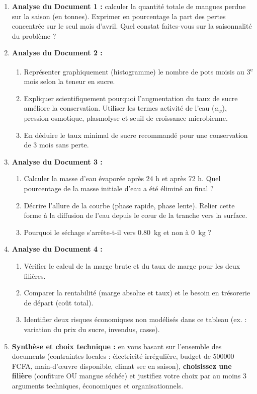 \documentclass[11pt]{article}
\newcommand{\cle}[1]{{\popxbold\color{popdark}#1}}
\newcounter{popsec}
\newcounter{popsub}
\newcommand{\courssub}[1]{%
  \stepcounter{popsub}%
  \par\vspace{9pt}\noindent{\popxbold\fontsize{11.5}{13}\selectfont\color{popink}{\color{poporange}\thepopsec.\thepopsub}\hspace{6pt}#1}\par\nopagebreak\vspace{4pt}
}
\begin{document}
\courssub{Consignes}
\begin{enumerate}
    \item \textbf{Analyse du Document 1 :} calculer la quantité totale de mangues perdue sur la saison (en tonnes). Exprimer en pourcentage la part des pertes concentrée sur le seul mois d'avril. Quel constat faites-vous sur la saisonnalité du problème ?
    \item \textbf{Analyse du Document 2 :}
    \begin{enumerate}
        \item Représenter graphiquement (histogramme) le nombre de pots moisis au 3\textsuperscript{e} mois selon la teneur en sucre.
        \item Expliquer scientifiquement pourquoi l'augmentation du taux de sucre améliore la conservation. Utiliser les termes \cle{activité de l'eau ($a_w$)}, \cle{pression osmotique}, \cle{plasmolyse} et \cle{seuil de croissance microbienne}.
        \item En déduire le taux minimal de sucre recommandé pour une conservation de 3 mois sans perte.
    \end{enumerate}
    \item \textbf{Analyse du Document 3 :}
    \begin{enumerate}
        \item Calculer la masse d'eau évaporée après 24 h et après 72 h. Quel pourcentage de la masse initiale d'eau a été éliminé au final ?
        \item Décrire l'allure de la courbe (phase rapide, phase lente). Relier cette forme à la diffusion de l'eau depuis le cœur de la tranche vers la surface.
        \item Pourquoi le séchage s'arrête-t-il vers \SI{0,80}{kg} et non à \SI{0}{kg} ?
    \end{enumerate}
    \item \textbf{Analyse du Document 4 :}
    \begin{enumerate}
        \item Vérifier le calcul de la marge brute et du taux de marge pour les deux filières.
        \item Comparer la rentabilité (marge absolue et taux) et le besoin en trésorerie de départ (coût total).
        \item Identifier deux risques économiques non modélisés dans ce tableau (ex. : variation du prix du sucre, invendus, casse).
    \end{enumerate}
    \item \textbf{Synthèse et choix technique :} en vous basant sur l'ensemble des documents (contraintes locales : électricité irrégulière, budget de \num{500000} FCFA, main-d'œuvre disponible, climat sec en saison), \textbf{choisissez une filière} (confiture OU mangue séchée) et justifiez votre choix par au moins 3 arguments techniques, économiques et organisationnels.

\end{enumerate}
\end{document}
